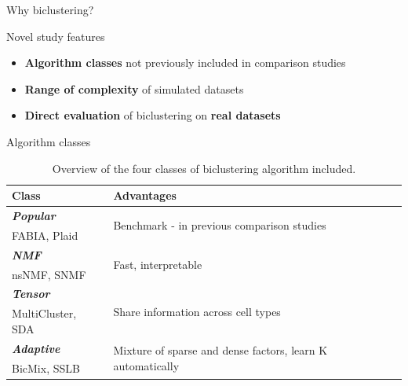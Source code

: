 \documentclass[final]{beamer}
\newlength{\onecolwid}
\begin{document}
\begin{frame}[t]
\begin{columns}[t]
\begin{column}{\onecolwid}
\begin{block}{Why biclustering?}
\end{block}






\begin{block}{Novel study features}

\begin{itemize}
    \item \textbf{Algorithm classes} not previously included in comparison studies
    \item \textbf{Range of complexity} of simulated datasets
    \item \textbf{Direct evaluation} of biclustering on \textbf{real datasets}
\end{itemize}

\end{block}





\begin{block}{Algorithm classes}

\begin{table}[t!]
    \caption{Overview of the four classes of biclustering algorithm included.}

    \begin{tabular}{ l | l }
\textbf{Class} & \textbf{Advantages} \\ \hline
\textbf{\textit{Popular}} & \multirow{2}{0.6 \textwidth}{Benchmark - in previous comparison studies} \\
     FABIA, Plaid & \\ \hline
    \textbf{\textit{NMF}} & \multirow{2}{0.6 \textwidth}{Fast, interpretable} \\
    nsNMF, SNMF & \\ \hline
    \textbf{\textit{Tensor}} & \multirow{2}{0.6 \textwidth}{Share information across cell types} \\
    MultiCluster, SDA & \\ \hline
    \textbf{\textit{Adaptive}} & \multirow{2}{0.6 \textwidth}{Mixture of sparse and dense factors, learn K automatically} \\
    BicMix, SSLB & \\ \hline
\end{tabular}
\end{table}


\end{block}
\end{column}
\end{columns}
\end{frame}
\end{document}
